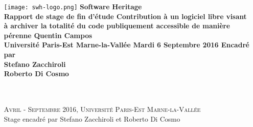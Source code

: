 \documentclass[$if(fontsize)$$fontsize$$endif$]{book} %
\begin{document}
\let\cleardoublepage\clearpage



\begin{titlepage}
\centering
\vfill
\vfill
\texttt{[image: swh-logo.png]}
\vfill
\bfseries\Huge Software Heritage\\
\LARGE Rapport de stage de fin d'étude
\vfill
\large Contribution à un logiciel libre visant à archiver la totalité du code publiquement accessible de manière pérenne
\vfill
\vfill
Quentin Campos\\
Université Paris-Est Marne-la-Vallée
\vskip0.5cm
Mardi 6 Septembre 2016
\vfill
\vfill
\small Encadré par\\
Stefano Zacchiroli\\
Roberto Di Cosmo
\end{titlepage}


\clearpage{}
\paragraph{}
\newpage{}
~\vfill

\thispagestyle{empty}

\noindent \textsc{Avril - Septembre 2016, Université Paris-Est Marne-la-Vallée}\\

\noindent Stage encadré par Stefano Zacchiroli et Roberto Di Cosmo\\ %
\end{document}

